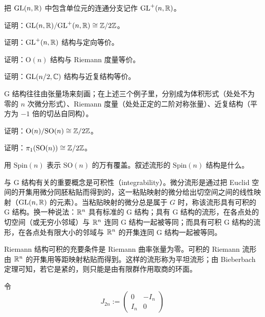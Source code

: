 把 $\mathrm{GL}(n,\mathbb{R})$ 中包含单位元的连通分支记作 $\mathrm{GL}^+(n,\mathbb{R})$。

\begin{exercise}
证明：$\mathrm{GL}(n,\mathbb{R})/\mathrm{GL}^+(n,\mathbb{R})\cong\mathbb{Z}/2\mathbb{Z}$。
\end{exercise}

\begin{exercise}
证明：$\mathrm{GL}^+(n,\mathbb{R})$ 结构与定向等价。
\end{exercise}

\begin{exercise}
证明：$\mathrm{O}(n)$ 结构与 Riemann 度量等价。
\end{exercise}

\begin{exercise}
证明：$\mathrm{GL}(n/2,\mathbb{C})$ 结构与近复结构等价。
\end{exercise}

G 结构往往由张量场来刻画；在上述三个例子里，分别成为体积形式（处处不为零的 $n$ 次微分形式）、Riemann 度量（处处正定的二阶对称张量）、近复结构（平方为 $-1$ 倍的切丛自同构）。

\begin{exercise}
证明：$\mathrm{O}(n)/\mathrm{SO}(n)\cong\mathbb{Z}/2\mathbb{Z}$。
\end{exercise}

\begin{exercise}
证明：$\pi_1(\mathrm{SO}(n))\cong\mathbb{Z}/2\mathbb{Z}$。
\end{exercise}

\begin{exercise}
用 $\mathrm{Spin}(n)$ 表示 $\mathrm{SO}(n)$ 的万有覆盖。叙述流形的 $\mathrm{Spin}(n)$ 结构是什么。
\end{exercise}

与 G 结构有关的重要概念是可积性（integrability）。微分流形是通过把 Euclid 空间的开集用微分同胚粘贴而得到的，这一粘贴映射的微分给出切空间之间的线性映射（$\mathrm{GL}(n,\mathbb{R})$ 的元素）。当粘贴映射的微分总是属于 $G$ 时，称该流形具有可积的 G 结构。换一种说法：$\mathbb{R}^n$ 具有标准的 G 结构；具有 G 结构的流形，在各点处的切空间（或无穷小邻域）与 $\mathbb{R}^n$ 连同 G 结构一起被等同；而具有可积 G 结构的流形，在各点处有限大小的邻域与 $\mathbb{R}^n$ 的开集连同 G 结构一起被等同。

Riemann 结构可积的充要条件是 Riemann 曲率张量为零。可积的 Riemann 流形由 $\mathbb{R}^n$ 的开集用等距映射粘贴而得到。这样的流形称为平坦流形；由 Bieberbach 定理可知，若它是紧的，则只能是由有限群作用取商的环面。

令
\begin{equation}
    J_{2n}:=\begin{pmatrix} 0 & -I_n \\ I_n & 0 \end{pmatrix} \tag{5.1}
\end{equation}

